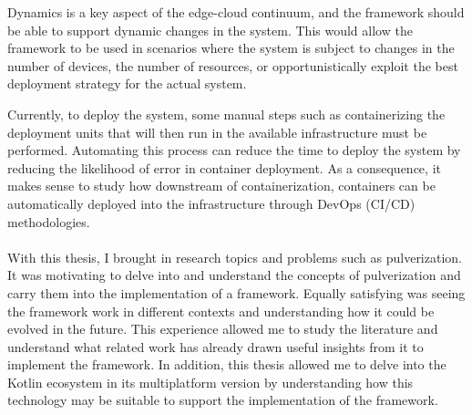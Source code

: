 Dynamics is a key aspect of the edge-cloud continuum, and the framework should be able to support dynamic changes in the system. This would allow
the framework to be used in scenarios where the system is subject to changes in the number of devices, the number of resources, or opportunistically
exploit the best deployment strategy for the actual system.

Currently, to deploy the system, some manual steps such as containerizing the deployment units that will then run in the available infrastructure
must be performed. Automating this process can reduce the time to deploy the system by reducing the likelihood of error in container deployment.
As a consequence, it makes sense to study how downstream of containerization, containers can be automatically deployed into the infrastructure
through DevOps (CI/CD) methodologies.

\paragraph*{}

With this thesis, I brought in research topics and problems such as pulverization. It was motivating to delve into and understand the
concepts of pulverization and carry them into the implementation of a framework. Equally satisfying was seeing the framework work in different
contexts and understanding how it could be evolved in the future. This experience allowed me to study the literature and understand what
related work has already drawn useful insights from it to implement the framework.
In addition, this thesis allowed me to delve into the Kotlin ecosystem in its multiplatform version by understanding how this technology may be
suitable to support the implementation of the framework.

